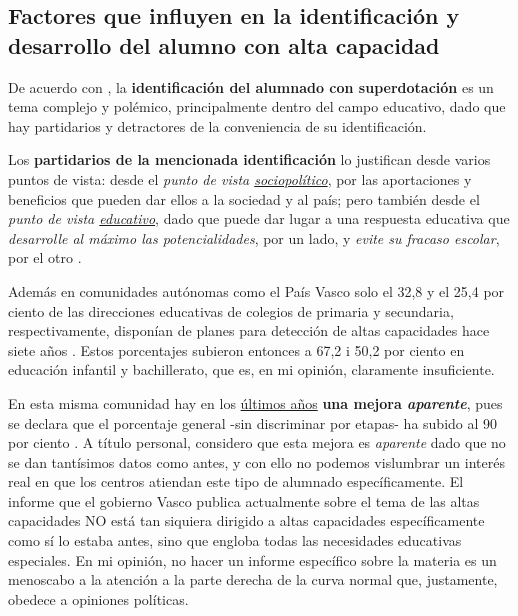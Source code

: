 \documentclass[12pt, a4paper]{article}
\begin{document}
	
	
	
	\subsection{Factores que influyen en la identificación y desarrollo del alumno con alta capacidad}
	
	
	De acuerdo con \parencite[10]{Arocas2002OrientPsicopedGVA}, la \textbf{identificación del alumnado con superdotación} es un tema complejo y polémico, principalmente
	dentro del campo educativo, dado que hay partidarios y detractores de la conveniencia de su identificación.
	
	Los \textbf{partidarios de la mencionada identificación} lo justifican desde varios puntos de vista: desde el \textit{punto de vista \underline{sociopolítico}}, por las aportaciones y beneficios que pueden dar ellos a la sociedad y al país; pero también desde el \textit{punto de vista \underline{educativo}}, dado que puede dar lugar a una respuesta educativa que \textit{desarrolle al máximo las potencialidades}, por un lado, y \textit{evite su fracaso escolar}, por el otro \parencite[10--11]{Arocas2002OrientPsicopedGVA}.
	
	Además en comunidades autónomas como el País Vasco solo el 32,8 y el 25,4 por ciento de las direcciones educativas de colegios de primaria y secundaria, respectivamente, disponían de planes para detección de altas capacidades hace siete años \parencite[20]{gobiernoVascoPlanAACC2019_recomanatUned}. Estos porcentajes subieron entonces a 67,2 i 50,2 por ciento en educación infantil y bachillerato, que es, en mi opinión, claramente insuficiente.
	
	
	
	En esta misma comunidad hay en los \underline{últimos años} \textbf{una mejora \textit{aparente}}, pues se declara que el porcentaje general -sin discriminar por etapas- ha subido al 90 por ciento \parencite[65]{gobiernoVascoEstrategia2024}. A título personal, considero que esta mejora es \textit{aparente} dado que no se dan tantísimos datos como antes, y con ello no podemos vislumbrar un interés real en que los centros atiendan este tipo de alumnado específicamente. El informe que el gobierno Vasco publica actualmente sobre el tema de las altas capacidades NO está tan siquiera dirigido a altas capacidades específicamente como sí lo estaba antes, sino que engloba todas las necesidades educativas especiales. En mi opinión, no hacer un informe específico sobre la materia es un menoscabo a la atención a la parte derecha de la curva normal que, justamente, obedece a opiniones políticas.
	
\end{document}
